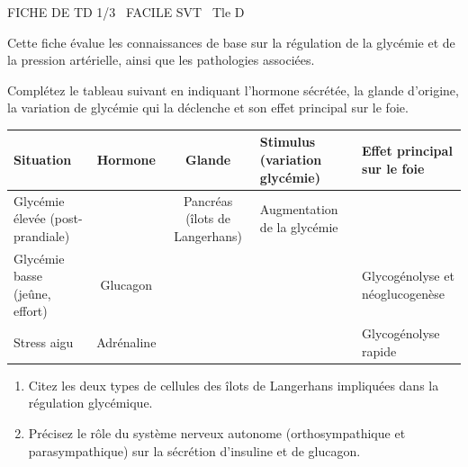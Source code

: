 \documentclass[11pt]{article}
\begin{document}
\begin{tcolorbox}[enhanced,colback=popink,colframe=popink,arc=10pt,boxrule=0pt,left=12pt,right=12pt,top=9pt,bottom=9pt]
{\color{white}\popxbold\small FICHE DE TD 1/3 \textbullet\ FACILE \hfill SVT \textbullet\ Tle D\par}
\end{tcolorbox}
\vspace{4pt}
Cette fiche évalue les connaissances de base sur la régulation de la glycémie et de la pression artérielle, ainsi que les pathologies associées.

\begin{exercice}
Complétez le tableau suivant en indiquant l'hormone sécrétée, la glande d'origine, la variation de glycémie qui la déclenche et son effet principal sur le foie.
\begin{center}
\begin{tabularx}{\linewidth}{|X|c|c|X|X|}
\hline
\textbf{Situation} & \textbf{Hormone} & \textbf{Glande} & \textbf{Stimulus (variation glycémie)} & \textbf{Effet principal sur le foie} \\
\hline
Glycémie élevée (post-prandiale) & & Pancréas (îlots de Langerhans) & Augmentation de la glycémie & \\
\hline
Glycémie basse (jeûne, effort) & Glucagon & & & Glycogénolyse et néoglucogenèse \\
\hline
Stress aigu & Adrénaline & & & Glycogénolyse rapide \\
\hline
\end{tabularx}
\end{center}
\begin{enumerate}
\item Citez les deux types de cellules des îlots de Langerhans impliquées dans la régulation glycémique.
\item Précisez le rôle du système nerveux autonome (orthosympathique et parasympathique) sur la sécrétion d'insuline et de glucagon.
\end{enumerate}
\end{exercice}
\end{document}
